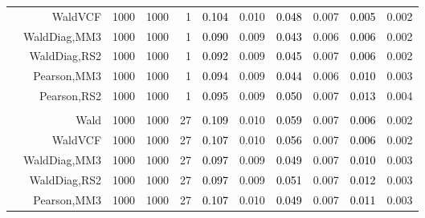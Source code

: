 \documentclass[
]{article}
\begin{document}
\begin{table}[H]
{\begin{tabular}[t]{lrrrrrrrlrr}
\hspace{1em} & WaldVCF & 1000 & 1000 & 1 & \textcolor{black}{0.104} & 0.010 & \textcolor{black}{0.048} & 0.007 & \textcolor{black}{0.005} & 0.002\\

\hspace{1em} & WaldDiag,MM3 & 1000 & 1000 & 1 & \textcolor{black}{0.090} & 0.009 & \textcolor{black}{0.043} & 0.006 & \textcolor{black}{0.006} & 0.002\\

\hspace{1em} & WaldDiag,RS2 & 1000 & 1000 & 1 & \textcolor{black}{0.092} & 0.009 & \textcolor{black}{0.045} & 0.007 & \textcolor{black}{0.006} & 0.002\\

\hspace{1em} & Pearson,MM3 & 1000 & 1000 & 1 & \textcolor{black}{0.094} & 0.009 & \textcolor{black}{0.044} & 0.006 & \textcolor{black}{0.010} & 0.003\\

\hspace{1em} & Pearson,RS2 & 1000 & 1000 & 1 & \textcolor{black}{0.095} & 0.009 & \textcolor{black}{0.050} & 0.007 & \textcolor{black}{0.013} & 0.004\\
\cmidrule{1-11}
\addlinespace[0.3em]
\multicolumn{11}{l}{\textbf{1F 15V}}\\
\hspace{1em} & Wald & 1000 & 1000 & 27 & \textcolor{black}{0.109} & 0.010 & \textcolor{black}{0.059} & 0.007 & \textcolor{black}{0.006} & 0.002\\

\hspace{1em} & WaldVCF & 1000 & 1000 & 27 & \textcolor{black}{0.107} & 0.010 & \textcolor{black}{0.056} & 0.007 & \textcolor{black}{0.006} & 0.002\\

\hspace{1em} & WaldDiag,MM3 & 1000 & 1000 & 27 & \textcolor{black}{0.097} & 0.009 & \textcolor{black}{0.049} & 0.007 & \textcolor{black}{0.010} & 0.003\\

\hspace{1em} & WaldDiag,RS2 & 1000 & 1000 & 27 & \textcolor{black}{0.097} & 0.009 & \textcolor{black}{0.051} & 0.007 & \textcolor{black}{0.012} & 0.003\\

\hspace{1em} & Pearson,MM3 & 1000 & 1000 & 27 & \textcolor{black}{0.107} & 0.010 & \textcolor{black}{0.049} & 0.007 & \textcolor{black}{0.011} & 0.003\\


\end{tabular}}
\end{table}
\end{document}
